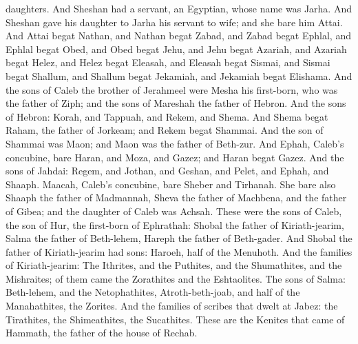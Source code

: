 daughters. And Sheshan had a servant, an Egyptian, whose name was Jarha. And Sheshan gave his daughter to Jarha his servant to wife; and she bare him Attai. And Attai begat Nathan, and Nathan begat Zabad, and Zabad begat Ephlal, and Ephlal begat Obed, and Obed begat Jehu, and Jehu begat Azariah, and Azariah begat Helez, and Helez begat Eleasah, and Eleasah begat Sismai, and Sismai begat Shallum, and Shallum begat Jekamiah, and Jekamiah begat Elishama.  And the sons of Caleb the brother of Jerahmeel were Mesha his first-born, who was the father of Ziph; and the sons of Mareshah the father of Hebron. And the sons of Hebron: Korah, and Tappuah, and Rekem, and Shema. And Shema begat Raham, the father of Jorkeam; and Rekem begat Shammai. And the son of Shammai was Maon; and Maon was the father of Beth-zur. And Ephah, Caleb’s concubine, bare Haran, and Moza, and Gazez; and Haran begat Gazez. And the sons of Jahdai: Regem, and Jothan, and Geshan, and Pelet, and Ephah, and Shaaph. Maacah, Caleb’s concubine, bare Sheber and Tirhanah. She bare also Shaaph the father of Madmannah, Sheva the father of Machbena, and the father of Gibea; and the daughter of Caleb was Achsah.  These were the sons of Caleb, the son of Hur, the first-born of Ephrathah: Shobal the father of Kiriath-jearim, Salma the father of Beth-lehem, Hareph the father of Beth-gader. And Shobal the father of Kiriath-jearim had sons: Haroeh, half of the Menuhoth. And the families of Kiriath-jearim: The Ithrites, and the Puthites, and the Shumathites, and the Mishraites; of them came the Zorathites and the Eshtaolites. The sons of Salma: Beth-lehem, and the Netophathites, Atroth-beth-joab, and half of the Manahathites, the Zorites. And the families of scribes that dwelt at Jabez: the Tirathites, the Shimeathites, the Sucathites. These are the Kenites that came of Hammath, the father of the house of Rechab. 

